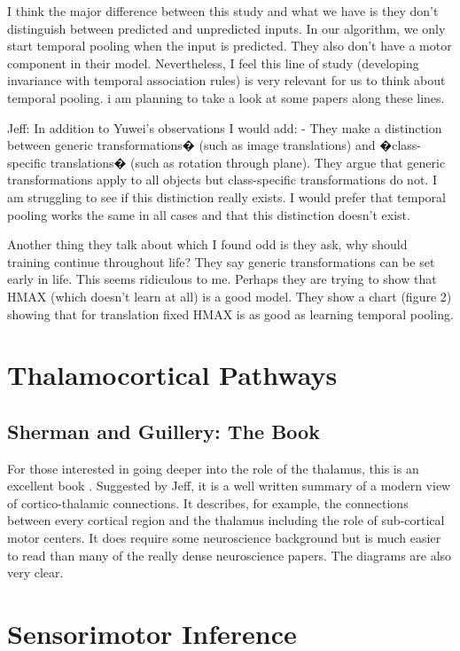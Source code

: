 \documentclass{article} %
\begin{document}
I think the major difference between this study and what we have is they don't
distinguish between predicted and unpredicted inputs. In our algorithm, we only
start temporal pooling when the input is predicted. They also don't have a motor
component in their model. Nevertheless, I feel this line of study (developing
invariance with temporal association rules) is very relevant for us to think
about temporal pooling. i am planning to take a look at some papers along these
lines.

Jeff:  In addition to Yuwei's observations I would add:  - They make a
distinction between generic transformations� (such as image translations) and
�class-specific translations� (such as rotation through plane).  They argue that
generic transformations apply to all objects but class-specific transformations
do not.  I am struggling to see if this distinction really exists.  I would
prefer that temporal pooling works the same in all cases and that this
distinction doesn't exist.


Another thing they talk about which I found odd is they ask, why should
training continue throughout life?  They say generic transformations can be set
early in life.  This seems ridiculous to me.  Perhaps they are trying to show
that HMAX (which doesn't learn at all) is a good model.  They show a chart
(figure 2) showing that for translation fixed HMAX is as good as learning
temporal pooling.


\section{Thalamocortical Pathways}

\subsection{Sherman and Guillery: The Book}

For those interested in going deeper into the role of the thalamus, this is an
excellent book \cite{Sherman}. Suggested by Jeff, it is a well written summary
of a modern view of cortico-thalamic connections. It describes, for example, the
connections between every cortical region and the thalamus including the role of
sub-cortical motor centers. It does require some neuroscience background but is
much easier to read than many of the really dense neuroscience papers. The
diagrams are also very clear.

\section{Sensorimotor Inference}
\end{document}
